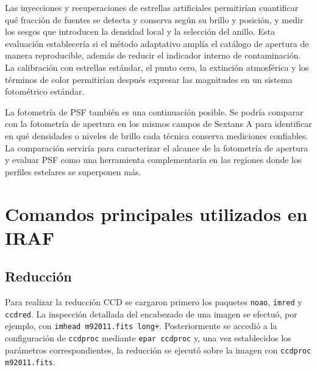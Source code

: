 \documentclass[12pt,letterpaper,oneside]{book}
\begin{document}
Las inyecciones y recuperaciones de estrellas artificiales permitirían cuantificar qué fracción de fuentes se detecta y conserva según su brillo y posición, y medir los sesgos que introducen la densidad local y la selección del anillo. Esta evaluación establecería si el método adaptativo amplía el catálogo de apertura de manera reproducible, además de reducir el indicador interno de contaminación. La calibración con estrellas estándar, el punto cero, la extinción atmosférica y los términos de color permitirían después expresar las magnitudes en un sistema fotométrico estándar.

La fotometría de PSF también es una continuación posible. Se podría comparar con la fotometría de apertura en los mismos campos de Sextans A para identificar en qué densidades o niveles de brillo cada técnica conserva mediciones confiables. La comparación serviría para caracterizar el alcance de la fotometría de apertura y evaluar PSF como una herramienta complementaria en las regiones donde los perfiles estelares se superponen más.









\appendix

\appendixpage

\noappendicestocpagenum

\addappheadtotoc



\chapter{Comandos principales utilizados en IRAF}

\section{Reducción}

Para realizar la reducción CCD se cargaron primero los paquetes \texttt{noao}, \texttt{imred} y \texttt{ccdred}. La inspección detallada del encabezado de una imagen se efectuó, por ejemplo, con \texttt{imhead m92011.fits long+}. Posteriormente se accedió a la configuración de \texttt{ccdproc} mediante \texttt{epar ccdproc} y, una vez establecidos los parámetros correspondientes, la reducción se ejecutó sobre la imagen con \texttt{ccdproc m92011.fits}.
\end{document}
